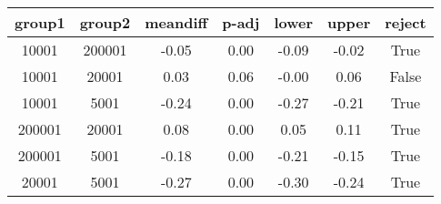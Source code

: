 \begin{tabular}{|c|c|c|c|c|c|c|}
\toprule
 group1 &  group2 &  meandiff &  p-adj &  lower &  upper &  reject \\
\midrule
  10001 &  200001 &     -0.05 &   0.00 &  -0.09 &  -0.02 &    True \\
  10001 &   20001 &      0.03 &   0.06 &  -0.00 &   0.06 &   False \\
  10001 &    5001 &     -0.24 &   0.00 &  -0.27 &  -0.21 &    True \\
 200001 &   20001 &      0.08 &   0.00 &   0.05 &   0.11 &    True \\
 200001 &    5001 &     -0.18 &   0.00 &  -0.21 &  -0.15 &    True \\
  20001 &    5001 &     -0.27 &   0.00 &  -0.30 &  -0.24 &    True \\
\bottomrule
\end{tabular}
